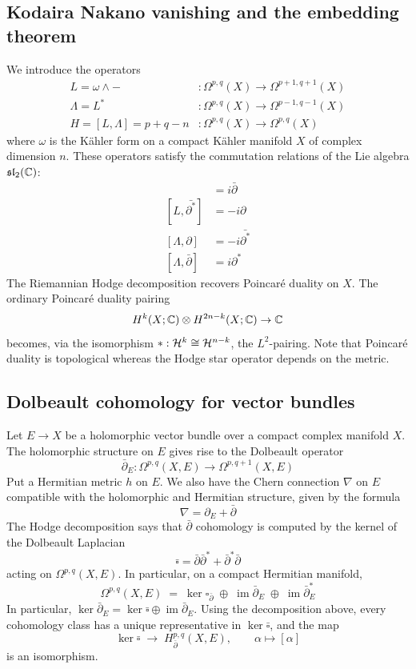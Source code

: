 \documentclass[12pt]{article}
\begin{document}
\subsection{Kodaira Nakano vanishing and the embedding theorem}
We introduce the operators 
\begin{align*}
    L = \omega\wedge - &:\Omega^{p,q}(X)\to \Omega^{p+1,q+1}(X) \\
    \Lambda = L^* &:\Omega^{p,q}(X)\to \Omega^{p-1,q-1}(X) \\
    H = [L,\Lambda] = p+q - n &:\Omega^{p,q}(X)\to \Omega^{p,q}(X)
\end{align*} 
where $\omega$ is the Kähler form on a compact Kähler manifold $X$ of complex dimension $n$. These operators satisfy the commutation relations of the Lie algebra $\mathfrak{sl}_2(\mathbb{C})$:
\begin{align*}
    [L,\partial^*] &= i\bar{\partial} \\
    [L,\bar{\partial^*}] &= -i\partial \\
    [\Lambda,\partial] &= -i\bar{\partial^*} \\
    [\Lambda,\bar{\partial}] &= i\partial^* 
\end{align*}
The Riemannian Hodge decomposition recovers Poincaré duality on $X$. The ordinary Poincaré duality pairing
\[H^k(X;\mathbb{C})\otimes H^{2n-k}(X;\mathbb{C})\to \mathbb{C}\]
becomes, via the isomorphism $*:{\mathcal{H}}^k \cong {\mathcal{H}}^{n-k}$, the $L^2$-pairing. Note that Poincaré duality is topological whereas the Hodge star operator depends on the metric.

\subsection{Dolbeault cohomology for vector bundles}
Let $E\to X$ be a holomorphic vector bundle over a compact complex manifold $X$. The holomorphic structure on $E$ gives rise to the Dolbeault operator
\[
\bar{\partial}_E:\Omega^{p,q}(X,E)\to \Omega^{p,q+1}(X,E)
\]
Put a Hermitian metric $h$ on $E$. We also have the Chern connection $\nabla$ on $E$ compatible with the holomorphic and Hermitian structure, given by the formula \[
\nabla = \partial_E + \bar{\partial}
\] The Hodge decomposition says that $\bar\partial$ cohomology is computed by the kernel of the Dolbeault Laplacian
\[\bar\square = \bar{\partial}\bar{\partial}^* + \bar{\partial}^*\bar{\partial}\]
acting on $\Omega^{p,q}(X,E)$. In particular, on a compact Hermitian manifold,
\[\Omega^{p,q}(X,E)
\;=\;
\ker \square_{\bar\partial}
\;\oplus\;
\operatorname{im}\bar\partial_E
\;\oplus\;
\operatorname{im}\bar\partial_E^*\]
In particular,
$\ker\bar\partial_E = \ker\bar\square \oplus \operatorname{im}\bar\partial_E$. Using the decomposition above, every cohomology class has a unique representative in $\ker\bar\square$, and the map
\[\ker\bar\square \;\longrightarrow\; H^{p,q}_{\bar\partial}(X,E),
\qquad \alpha \longmapsto [\alpha]\]
is an isomorphism.
 
\end{document}
